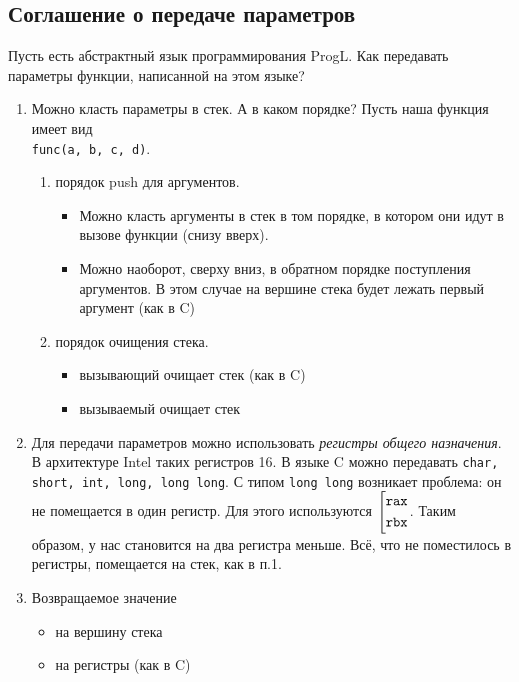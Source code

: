 \subsection{Соглашение о передаче параметров}

Пусть есть абстрактный язык программирования ProgL.
Как передавать параметры функции, написанной на этом языке?
\begin{enumerate}
\item Можно класть параметры в стек. А в каком порядке? Пусть наша функция имеет вид \\\verb!func(a, b, c, d)!.
\begin{enumerate}
\item порядок push для аргументов.
\begin{itemize}
\item Можно класть аргументы в стек в том порядке, в котором они идут в вызове функции (снизу вверх). 

\item Можно наоборот, сверху вниз, в обратном порядке поступления аргументов. В этом случае на вершине стека будет лежать первый аргумент (как в C)

\end{itemize}
\item порядок очищения стека.
\begin{itemize}
\item вызывающий очищает стек (как в C)
\item вызываемый очищает стек
\end{itemize}
\end{enumerate}
\item Для передачи параметров можно использовать \textit{регистры общего назначения}. В архитектуре Intel таких регистров 16. В языке C можно передавать \verb!char, short, int, long, long long!. С типом \verb!long long! возникает проблема: он не помещается в один регистр. Для этого используются {\small$\left[\begin{gathered}
\verb!rax!\\
\verb!rbx!\\
\end{gathered}\right.$}. Таким образом, у нас становится на два регистра меньше. Всё, что не поместилось в регистры, помещается на стек, как в п.1.
\item Возвращаемое значение
\begin{itemize}
\item на вершину стека
\item на регистры (как в C)
\end{itemize}
\end{enumerate}

